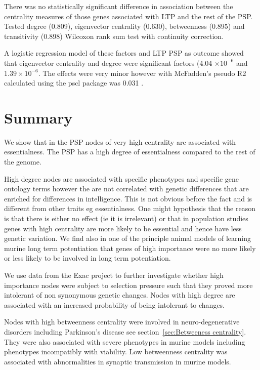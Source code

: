     There was no statistically significant difference in association between the centrality measures of those genes associated with LTP and the rest of the PSP. Tested degree (0.809), eigenvector centrality (0.630), betweenness (0.895) and transitivity (0.898) Wilcoxon rank sum test with continuity correction. 
    
    A logistic regression model of these factors and LTP PSP as outcome showed that eigenvector centrality and degree were significant factors (4.04 $\times 10^{-6}$ and $1.39 \times 10^{-6}$. The effects were very minor however with McFadden's pseudo R2 \cite{mcfadden1973conditional} calculated using the pscl package was  0.031 \cite{jackman2017package}.


\section{Summary}

We show that in the PSP nodes of very high centrality are associated with essentialness. The PSP has a high degree of essentialness compared to the rest of the genome. 

High degree nodes are associated with specific phenotypes and specific gene ontology terms however the are not correlated with genetic differences that are enriched for differences in intelligence. This is not obvious before the fact and is different from other traits eg essentialness. One might hypothesis that the reason is that there is either no effect (ie it is irrelevant) or that in population studies genes with high centrality are more likely to be essential and hence have less genetic variation. We find also in one of the principle animal models of learning murine long term potentiation that genes of high importance were no more likely or less likely to be involved in long term potentiation.

We use data from the Exac project to further investigate whether high importance nodes were subject to selection pressure such that they proved more intolerant of non synonymous genetic changes. Nodes with high degree are associated with an increased probability of being intolerant to changes. 

Nodes with high betweenness centrality were involved in neuro-degenerative disorders including Parkinson's disease see section~\ref{sec:Betweeness centrality}. They were also associated with severe phenotypes in murine models including phenotypes incompatibly with viability. Low betweenness centrality was associated with abnormalities in synaptic transmission in murine models. 

